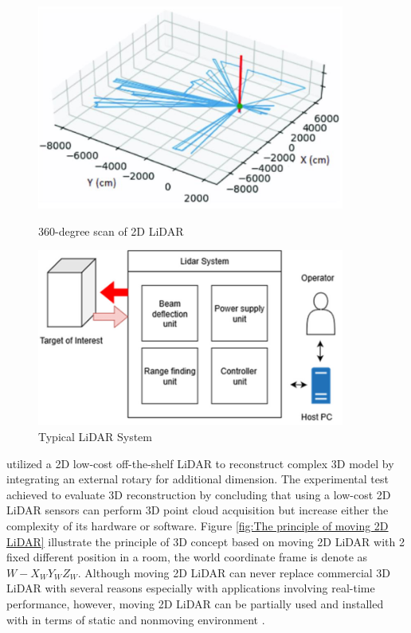 \begin{figure}[H]
    \centering
    \begin{minipage}{0.5\textwidth}
        \centering
        \includegraphics[width=0.9\textwidth]{Figures/360-degree-lidar-scan.png} %
        \caption{360-degree scan of 2D LiDAR}
        \label{fig:360-dgree-lidar-scan}
    \end{minipage}\hfill
    \begin{minipage}{0.5\textwidth}
        \centering
        \includegraphics[width=0.9\textwidth]{Figures/Block-diagram-of-light-detection-and-ranging-LiDAR-system} %
        \caption{Typical LiDAR System}
        \label{fig:Typical LiDAR System}
    \end{minipage}
\end{figure}

\citet{kang2018} utilized a 2D low-cost off-the-shelf LiDAR to reconstruct complex 3D model by integrating an external rotary for additional dimension. The experimental test achieved to evaluate 3D reconstruction by concluding that using a low-cost 2D LiDAR sensors can  perform 3D point cloud acquisition but increase either the complexity of its hardware or software. Figure \ref{fig:The principle of moving 2D LiDAR} illustrate the principle of 3D concept based on moving 2D LiDAR with 2 fixed different position in a room, the world coordinate frame is denote as 
\begin{math}
    W-X_{W}Y_{W}Z_{W}.
\end{math}
Although moving 2D LiDAR can never replace commercial 3D LiDAR with several reasons especially with applications involving real-time performance, however, moving 2D LiDAR can be partially used and installed with in terms of static and nonmoving environment \citep{bi2021}.

